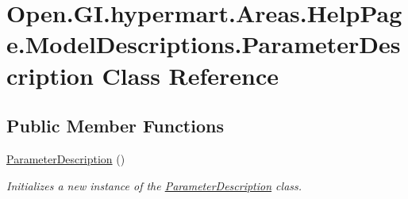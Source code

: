 \hypertarget{class_open_1_1_g_i_1_1hypermart_1_1_areas_1_1_help_page_1_1_model_descriptions_1_1_parameter_description}{}\section{Open.\+G\+I.\+hypermart.\+Areas.\+Help\+Page.\+Model\+Descriptions.\+Parameter\+Description Class Reference}
\label{class_open_1_1_g_i_1_1hypermart_1_1_areas_1_1_help_page_1_1_model_descriptions_1_1_parameter_description}


 


\subsection*{Public Member Functions}
\begin{DoxyCompactItemize}
\item 
\hyperlink{class_open_1_1_g_i_1_1hypermart_1_1_areas_1_1_help_page_1_1_model_descriptions_1_1_parameter_description_a6a431c66f4493e970ceb5477cede9744}{Parameter\+Description} ()
\begin{DoxyCompactList}\small\item\em Initializes a new instance of the \hyperlink{class_open_1_1_g_i_1_1hypermart_1_1_areas_1_1_help_page_1_1_model_descriptions_1_1_parameter_description}{Parameter\+Description} class. \end{DoxyCompactList}\end{DoxyCompactItemize}
